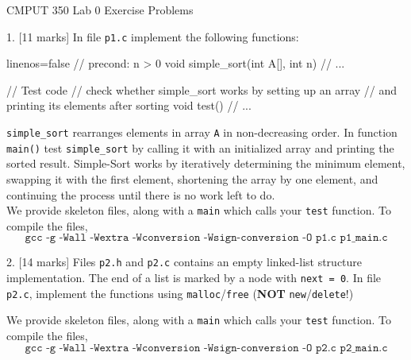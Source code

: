 \documentclass[a4paper,11pt]{article}
\begin{document}

\begin{center}
{\Large CMPUT 350 Lab 0 Exercise Problems}
\end{center}


1. [11 marks] In file \texttt{p1.c} implement the following functions:
\begin{cppcode*}{linenos=false}
// precond: n > 0
void simple_sort(int A[], int n) {
    // ...
}

// Test code
// check whether simple_sort works by setting up an array
// and printing its elements after sorting
void test() {
    // ...
}
\end{cppcode*}

\texttt{simple\_sort} rearranges elements in array \texttt{A} in non-decreasing order. 
In function \texttt{main()} test \texttt{simple\_sort} by calling it with an initialized array and
printing the sorted result. 
Simple-Sort works by iteratively determining the minimum element, 
swapping it with the first element, shortening the array by one element, 
and continuing the process until there is no work left to do. \\

We provide skeleton files, along with a \texttt{main} which calls your \texttt{test} function.
To compile the files, 
\[ \texttt{gcc -g -Wall -Wextra -Wconversion -Wsign-conversion -O p1.c p1\_main.c} \]
 
\linerule

2. [14 marks]  Files \texttt{p2.h} and \texttt{p2.c} contains an empty linked-list structure implementation. 
The end of a list is marked by a node with \texttt{next = 0}.
In file \texttt{p2.c}, implement the functions using \texttt{malloc}/\texttt{free} 
(\textbf{NOT} \texttt{new}/\texttt{delete}!)

We provide skeleton files, along with a \texttt{main} which calls your \texttt{test} function.
To compile the files, 
\[ \texttt{gcc -g -Wall -Wextra -Wconversion -Wsign-conversion -O p2.c p2\_main.c} \]
\end{document}
